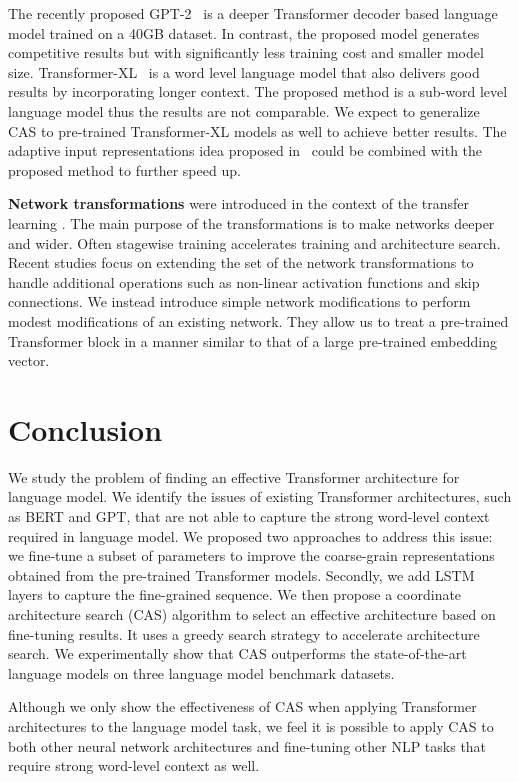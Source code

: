 \documentclass[11pt,a4paper]{article}
\begin{document}
The recently proposed GPT-2~\cite{radford2019language} is a deeper Transformer decoder based language model trained on a 40GB dataset. In contrast, the proposed model generates competitive results but with significantly less training cost and smaller model size. Transformer-XL~\cite{dai2019transformer} is a word level language model that also delivers good results by incorporating longer context. The proposed method is a sub-word level language model thus the results are not comparable. We expect to generalize CAS to pre-trained Transformer-XL models as well to achieve better results. The adaptive input representations idea proposed in~\cite{baevski2018adaptive} could be combined with the proposed method to further speed up.

{\bf Network transformations} were introduced in the context of the transfer learning \cite{ChenGS15}. The main purpose of the transformations is to make networks deeper and wider. Often stagewise training accelerates training and architecture search. Recent studies \cite{wei2016network,cai2018efficient,Elsken04528} focus on extending the set of the network transformations to handle additional operations such as non-linear activation functions and skip connections. We instead introduce simple network modifications to perform modest modifications of an existing network. They allow us to treat a pre-trained Transformer block in a manner similar to that of a large pre-trained embedding vector. 
 \section{Conclusion}

We study the problem of finding an effective Transformer architecture for language model. 
We identify the issues of existing Transformer architectures, such as BERT and GPT, that are not able to capture the strong word-level context required in language model.
We proposed two approaches to address this issue: we fine-tune a subset of parameters to improve the coarse-grain representations obtained from the pre-trained Transformer models. Secondly, we add LSTM layers to capture the fine-grained sequence. We then propose a coordinate architecture search (CAS) algorithm to select an effective architecture based on fine-tuning results. It uses a greedy search strategy to accelerate architecture search. We experimentally show that CAS outperforms the state-of-the-art language models on three language model benchmark datasets.

Although we only show the effectiveness of CAS when applying Transformer architectures to the language model task, we feel it is possible to apply CAS to both other neural network architectures and fine-tuning other NLP tasks that require strong word-level context as well.  



\end{document}
